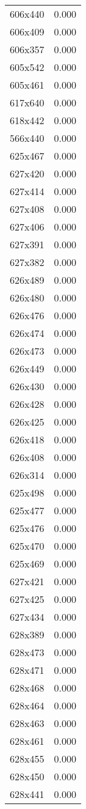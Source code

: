 \begin{table}
\begin{tabular}{lr}
606x440 & 0.000 \\
606x409 & 0.000 \\
606x357 & 0.000 \\
605x542 & 0.000 \\
605x461 & 0.000 \\
617x640 & 0.000 \\
618x442 & 0.000 \\
566x440 & 0.000 \\
625x467 & 0.000 \\
627x420 & 0.000 \\
627x414 & 0.000 \\
627x408 & 0.000 \\
627x406 & 0.000 \\
627x391 & 0.000 \\
627x382 & 0.000 \\
626x489 & 0.000 \\
626x480 & 0.000 \\
626x476 & 0.000 \\
626x474 & 0.000 \\
626x473 & 0.000 \\
626x449 & 0.000 \\
626x430 & 0.000 \\
626x428 & 0.000 \\
626x425 & 0.000 \\
626x418 & 0.000 \\
626x408 & 0.000 \\
626x314 & 0.000 \\
625x498 & 0.000 \\
625x477 & 0.000 \\
625x476 & 0.000 \\
625x470 & 0.000 \\
625x469 & 0.000 \\
627x421 & 0.000 \\
627x425 & 0.000 \\
627x434 & 0.000 \\
628x389 & 0.000 \\
628x473 & 0.000 \\
628x471 & 0.000 \\
628x468 & 0.000 \\
628x464 & 0.000 \\
628x463 & 0.000 \\
628x461 & 0.000 \\
628x455 & 0.000 \\
628x450 & 0.000 \\
628x441 & 0.000 \\

\end{tabular}
\end{table}
